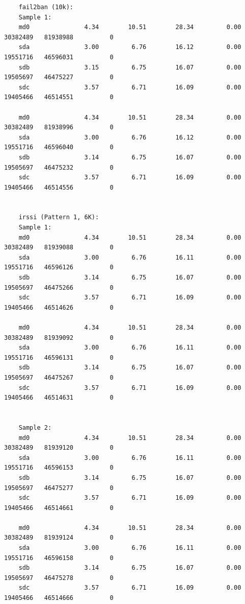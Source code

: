 \documentclass{article}
\begin{document}
\begin{verbatim}
	fail2ban (10k):
	Sample 1:
	md0               4.34        10.51        28.34         0.00   30382489   81938988          0
	sda               3.00         6.76        16.12         0.00   19551716   46596031          0
	sdb               3.15         6.75        16.07         0.00   19505697   46475227          0
	sdc               3.57         6.71        16.09         0.00   19405466   46514551          0

	md0               4.34        10.51        28.34         0.00   30382489   81938996          0
	sda               3.00         6.76        16.12         0.00   19551716   46596040          0
	sdb               3.14         6.75        16.07         0.00   19505697   46475232          0
	sdc               3.57         6.71        16.09         0.00   19405466   46514556          0


	irssi (Pattern 1, 6K):
	Sample 1:
	md0               4.34        10.51        28.34         0.00   30382489   81939088          0
	sda               3.00         6.76        16.11         0.00   19551716   46596126          0
	sdb               3.14         6.75        16.07         0.00   19505697   46475266          0
	sdc               3.57         6.71        16.09         0.00   19405466   46514626          0

	md0               4.34        10.51        28.34         0.00   30382489   81939092          0
	sda               3.00         6.76        16.11         0.00   19551716   46596131          0
	sdb               3.14         6.75        16.07         0.00   19505697   46475267          0
	sdc               3.57         6.71        16.09         0.00   19405466   46514631          0


	Sample 2:
	md0               4.34        10.51        28.34         0.00   30382489   81939120          0
	sda               3.00         6.76        16.11         0.00   19551716   46596153          0
	sdb               3.14         6.75        16.07         0.00   19505697   46475277          0
	sdc               3.57         6.71        16.09         0.00   19405466   46514661          0

	md0               4.34        10.51        28.34         0.00   30382489   81939124          0
	sda               3.00         6.76        16.11         0.00   19551716   46596158          0
	sdb               3.14         6.75        16.07         0.00   19505697   46475278          0
	sdc               3.57         6.71        16.09         0.00   19405466   46514666          0



\end{verbatim}
\end{document}
